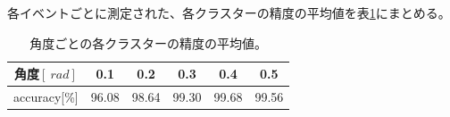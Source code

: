 各イベントごとに測定された、各クラスターの精度の平均値を表\ref{acc_Grav}にまとめる。

\begin{table}[h]
	\begin{center}
		\begin{tabular}{|c|c|c|c|c|c|}
		\hline
		角度$[\SI{}{rad}]$&0.1&0.2&0.3&0.4&0.5\\\hline\hline
		accuracy[\%]&96.08&98.64&99.30&99.68&99.56\\\hline
		\end{tabular}
	\end{center}
	\caption[角度ごとの各クラスターの精度の平均値]{角度ごとの各クラスターの精度の平均値。}
\label{acc_Grav}
\end{table}

